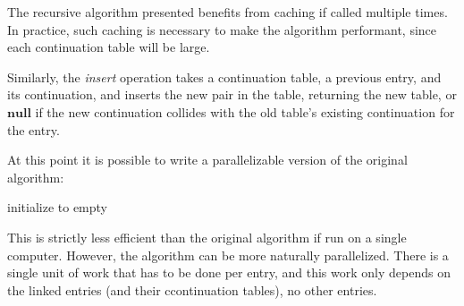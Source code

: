 \documentclass{article}
\begin{document}
The recursive algorithm presented benefits from caching if called multiple times.  In practice, such caching is necessary to make the algorithm performant, since each continuation table will be large.

Similarly, the \emph{insert} operation takes a continuation table, a previous entry, and its continuation, and inserts the new pair in the table, returning the new table, or $\mathbf{null}$ if the new continuation collides with
the old table's existing continuation for the entry.

At this point it is possible to write a parallelizable version of the original algorithm:

\begin{algorithm}
  initialize \Ctables to empty\;
   {
     {
    }
  }
  \;
\end{algorithm}

This is strictly less efficient than the original algorithm if run on a single computer.  However, the algorithm can be more naturally parallelized.  There is a single unit of work that has to be done per entry, and this work only depends on the linked entries (and their ccontinuation tables), no other entries.
\end{document}
